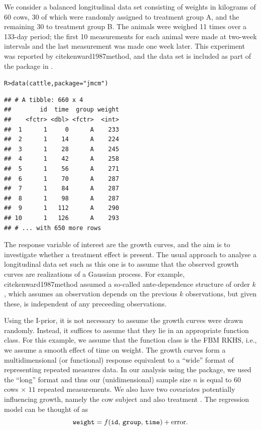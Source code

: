 \documentclass[a4paper,showframe,11pt]{report}\usepackage[]{graphicx}\usepackage[]{color}
\makeatletter
\newcommand{\hlstr}[1]{\textcolor[rgb]{0.063,0.58,0.627}{#1}}%
\newcommand{\hlstd}[1]{\textcolor[rgb]{0.196,0.196,0.196}{#1}}%
\newcommand{\hlkwc}[1]{\textcolor[rgb]{0,0.631,0.314}{#1}}%
\newcommand{\hlkwd}[1]{\textcolor[rgb]{0.78,0.227,0.412}{#1}}%
\newenvironment{kframe}{%
 \def\at@end@of@kframe{}%
 \ifinner\ifhmode%
  \def\at@end@of@kframe{\end{minipage}}%
  \begin{minipage}{\columnwidth}%
 \fi\fi%
 \def\FrameCommand##1{\hskip\@totalleftmargin \hskip-\fboxsep
 \colorbox{shadecolor}{##1}\hskip-\fboxsep
     \hskip-\linewidth \hskip-\@totalleftmargin \hskip\columnwidth}%
 \MakeFramed {\advance\hsize-\width
   \@totalleftmargin\z@ \linewidth\hsize
   \@setminipage}}%
 {\par\unskip\endMakeFramed%
 \at@end@of@kframe}
\newenvironment{knitrout}{}{} %
\makeatother
\begin{document}
We consider a balanced longitudinal data set consisting of weights in kilograms of 60 cows, 30 of which were randomly assigned to treatment group A, and the remaining 30 to treatment group B. The animals were weighed 11 times over a 133-day period; the first 10 measurements for each animal were made at two-week intervals and the last measurement was made one week later. This experiment was reported by cite{kenward1987method}, and the data set is included as part of the package  in .

\begin{knitrout}
\color{fgcolor}\begin{kframe}
\begin{alltt}
\hlstd{R> }\hlkwd{data}\hlstd{(cattle,} \hlkwc{package} \hlstd{=} \hlstr{"jmcm"}\hlstd{)}
\end{alltt}
\begin{verbatim}
## # A tibble: 660 x 4
##        id  time  group weight
##    <fctr> <dbl> <fctr>  <int>
##  1      1     0      A    233
##  2      1    14      A    224
##  3      1    28      A    245
##  4      1    42      A    258
##  5      1    56      A    271
##  6      1    70      A    287
##  7      1    84      A    287
##  8      1    98      A    287
##  9      1   112      A    290
## 10      1   126      A    293
## # ... with 650 more rows
\end{verbatim}
\end{kframe}
\end{knitrout}

The response variable of interest are the  growth curves, and the aim is to investigate whether a treatment effect is present. The usual approach to analyse a longitudinal data set such as this one is to assume that the observed growth curves are realizations of a Gaussian process. For example, cite{kenward1987method} assumed a so-called ante-dependence structure of order $k$, which assumes an observation depends on the previous $k$ observations, but given these, is independent of any preceeding observations.

Using the I-prior, it is not necessary to assume the growth curves were drawn randomly. Instead, it suffices to assume that they lie in an appropriate function class. For this example, we assume that the function class is the FBM RKHS, i.e., we assume a smooth effect of time on weight. The growth curves form a multidimensional (or functional) response equivalent to a ``wide'' format of representing repeated measures data. In our analysis using the  package, we used the ``long'' format and thus our (unidimensional) sample size $n$ is equal to $60$ cows $\times$ $11$ repeated measurements. We also have two covariates potentially influencing growth, namely the cow subject  and also treatment . The regression model can be thought of as
\[
  \text{\texttt{weight}} = f(\text{\texttt{id}}, \, \text{\texttt{group}}, \, \text{\texttt{time}}) + \text{error}.
\]
\end{document}
